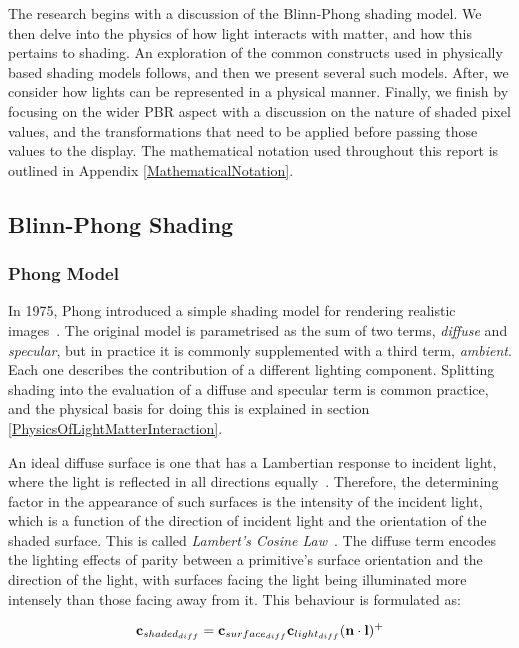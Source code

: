 The research begins with a discussion of the Blinn-Phong shading model. We then delve into the physics of how light interacts with matter, and how this pertains to shading. An exploration of the common constructs used in physically based shading models follows, and then we present several such models. After, we consider how lights can be represented in a physical manner. Finally, we finish by focusing on the wider PBR aspect with a discussion on the nature of shaded pixel values, and the transformations that need to be applied before passing those values to the display. The mathematical notation used throughout this report is outlined in Appendix \ref{MathematicalNotation}.

\subsection{Blinn-Phong Shading} \label{BlinnPhongShading}

\subsubsection{Phong Model}

In 1975, Phong introduced a simple shading model for rendering realistic images~\cite{PhongShading}. The original model is parametrised as the sum of two terms, \textit{diffuse} and \textit{specular}, but in practice it is commonly supplemented with a third term, \textit{ambient}. Each one describes the contribution of a different lighting component. Splitting shading into the evaluation of a diffuse and specular term is common practice, and the physical basis for doing this is explained in section \ref{PhysicsOfLightMatterInteraction}.

An ideal diffuse surface is one that has a Lambertian response to incident light, where the light is reflected in all directions equally~\cite{Lambert}. Therefore, the determining factor in the appearance of such surfaces is the intensity of the incident light, which is a function of the direction of incident light and the orientation of the shaded surface. This is called \textit{Lambert's Cosine Law}~\cite{Lambert}. The diffuse term encodes the lighting effects of parity between a primitive's surface orientation and the direction of the light, with surfaces facing the light being illuminated more intensely than those facing away from it. This behaviour is formulated as:

\begin{equation}
	\mathbf{c}_{shaded_{diff}} = \mathbf{c}_{surface_{diff}}\mathbf{c}_{light_{diff}}(\mathbf{n}\cdot\mathbf{l})^+
\end{equation}

